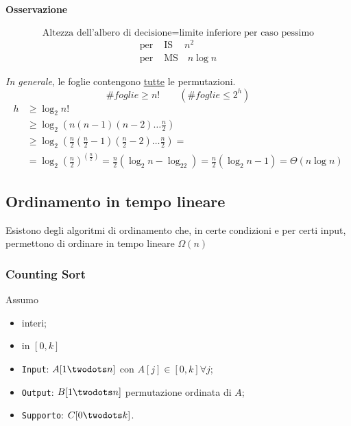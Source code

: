 \paragraph{Osservazione} 
$$ \text{Altezza dell'albero di decisione} = \text{limite inferiore per caso pessimo}$$
\begin{align*}
    \text{per }& \text{IS} \ \quad n^2 \\
    \text{per }& \text{MS} \quad n \log n
\end{align*}

\emph{In generale}, le foglie contengono \underline{tutte} le permutazioni.
$$\# foglie \geq n! \qquad (\# foglie \leq 2^h)$$
\begin{align*}
    h & \geq \log_2 n! \\
    & \geq \log_2 \left( n(n-1)(n-2) \dots \frac{n}{2}\right) \\
    & \geq \log_2 \left( \frac{n}{2}\left(\frac{n}{2}-1\right)\left(\frac{n}{2}-2\right) \dots \frac{n}{2}\right) = \\
    & = \log_2 \left( \frac{n}{2} \right)^{(\frac{n}{2})} 
        = \frac{n}{2} \left( \log_2 n - \log_22\right)
        = \frac{n}{2} (\log_2 n - 1) = \Theta (n \log n)
\end{align*}

\subsection{Ordinamento in tempo lineare}
Esistono degli algoritmi di ordinamento che, in certe condizioni e per certi input, permettono
di ordinare in tempo lineare $\Omega (n)$

\subsubsection{Counting Sort}
Assumo
\begin{itemize}[label=$-$]
    \item interi;
    \item in $[0,k]$
\end{itemize}

\begin{itemize}[label=]
    \item \texttt{Input}: $A[1\twodots n]$ con $A[j] \in [0,k] \forall j$;
    \item \texttt{Output}: $B[1\twodots n]$ permutazione ordinata di $A$;
    \item \texttt{Supporto}: $C[0\twodots k]$.
\end{itemize}

